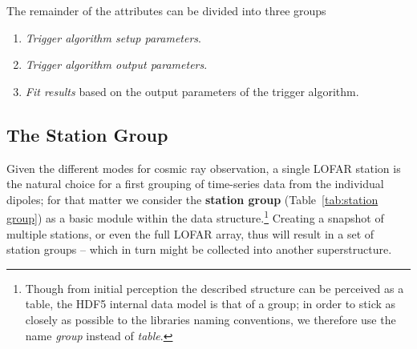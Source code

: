 \documentclass[a4paper,10pt,bibtotoc]{scrartcl}
\begin{document}
The remainder of the attributes can be divided into three groups
\begin{enumerate}
\item \textsl{Trigger algorithm setup parameters}.
\item \textsl{Trigger algorithm output parameters}.
\item \textsl{Fit results} based on the output parameters of the trigger algorithm.

\end{enumerate}


\subsection{The Station Group}
\label{sec:station group}

Given the different modes for cosmic ray observation, a single LOFAR
station is the natural choice for a first grouping of time-series
data from the individual dipoles; for that matter we consider the
\textbf{station group} (Table~\ref{tab:station group}) as a basic module within
the data structure.\footnote{Though from initial perception the described
structure can be perceived as a table, the HDF5 internal data model is that
of a group; in order to stick as closely as possible to the libraries naming
conventions, we therefore use the name \textsl{group} instead of \textsl{table}.}
Creating a snapshot of multiple stations, or even the full LOFAR array, thus will
result in a set of station groups -- which in turn might be collected into
another superstructure.
\end{document}
